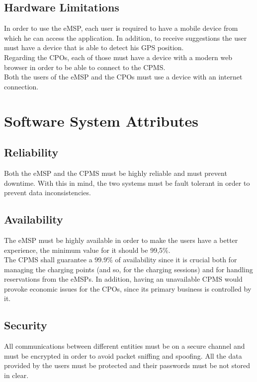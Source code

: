 \documentclass{Configuration_Files/PoliMi3i_thesis}
\begin{document}
\subsection{Hardware Limitations}

In order to use the eMSP, each user is required to have a mobile device from which he can access the application. In addition, to receive suggestions the user must have a device that is able to detect his GPS position.\\
Regarding the CPOs, each of those must have a device with a modern web browser in order to be able to connect to the CPMS.\\
Both the users of the eMSP and the CPOs must use a device with an internet connection.

\section{Software System Attributes}

\subsection{Reliability}

Both the eMSP and the CPMS must be highly reliable and must prevent downtime. With this in mind, the two systems must be fault tolerant in order to prevent data inconsistencies.

\subsection{Availability}

The eMSP must be highly available in order to make the users have a better experience, the minimum value for it should be 99,5\%.\\
The CPMS shall guarantee a 99.9\% of availability since it is crucial both for managing the charging points (and so, for the charging sessions) and for handling reservations from the eMSPs. In addition, having an unavailable CPMS would provoke economic issues for the CPOs, since its primary business is controlled by it.

\subsection{Security}

All communications between different entities must be on a secure channel and must be encrypted in order to avoid packet sniffing and spoofing. All the data provided by the users must be protected and their passwords must be not stored in clear.
\end{document}
